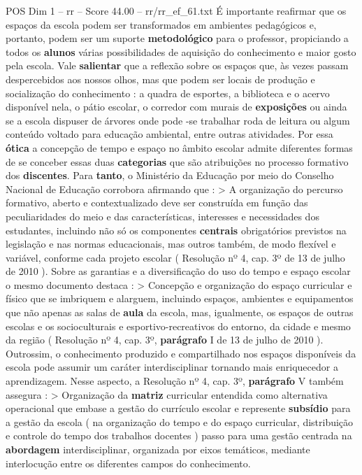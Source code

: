 \begin{textsample}{POS Dim 1 – rr – Score 44.00 – rr/rr\_ef\_61.txt}
É importante reafirmar que os espaços da escola podem ser transformados em ambientes pedagógicos e, portanto, podem ser um suporte \textbf{metodológico} para o professor, propiciando a todos os \textbf{alunos} várias possibilidades de aquisição do conhecimento e maior gosto pela escola.
Vale \textbf{salientar} que a reflexão sobre os espaços que, às vezes passam despercebidos aos nossos olhos, mas que podem ser locais de produção e socialização do conhecimento : a quadra de esportes, a biblioteca e o acervo disponível nela, o pátio escolar, o corredor com murais de \textbf{exposições} ou ainda se a escola dispuser de árvores onde pode -se trabalhar roda de leitura ou algum conteúdo voltado para educação ambiental, entre outras atividades.
Por essa \textbf{ótica} a concepção de tempo e espaço no âmbito escolar admite diferentes formas de se conceber essas duas \textbf{categorias} que são atribuições no processo formativo dos \textbf{discentes}.
Para \textbf{tanto}, o Ministério da Educação por meio do Conselho Nacional de Educação corrobora afirmando que : > A organização do percurso formativo, aberto e contextualizado deve ser construída em função das peculiaridades do meio e das características, interesses e necessidades dos estudantes, incluindo não só os componentes \textbf{centrais} obrigatórios previstos na legislação e nas normas educacionais, mas outros também, de modo flexível e variável, conforme cada projeto escolar ( Resolução nº 4, cap. 3º de 13 de julho de 2010 ).
Sobre as garantias e a diversificação do uso do tempo e espaço escolar o mesmo documento destaca : > Concepção e organização do espaço curricular e físico que se imbriquem e alarguem, incluindo espaços, ambientes e equipamentos que não apenas as salas de \textbf{aula} da escola, mas, igualmente, os espaços de outras escolas e os socioculturais e esportivo-recreativos do entorno, da cidade e mesmo da região ( Resolução nº 4, cap. 3º, \textbf{parágrafo} I de 13 de julho de 2010 ).
Outrossim, o conhecimento produzido e compartilhado nos espaços disponíveis da escola pode assumir um caráter interdisciplinar tornando mais enriquecedor a aprendizagem.
Nesse aspecto, a Resolução nº 4, cap. 3º, \textbf{parágrafo} V também assegura : > Organização da \textbf{matriz} curricular entendida como alternativa operacional que embase a gestão do currículo escolar e represente \textbf{subsídio} para a gestão da escola ( na organização do tempo e do espaço curricular, distribuição e controle do tempo dos trabalhos docentes ) passo para uma gestão centrada na \textbf{abordagem} interdisciplinar, organizada por eixos temáticos, mediante interlocução entre os diferentes campos do conhecimento.

\end{textsample}
